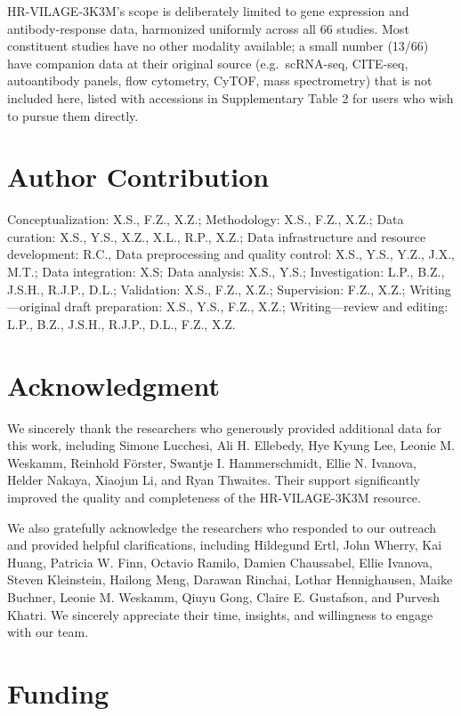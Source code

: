 \documentclass[
  12pt]{article}
\begin{document}
\noindent HR-VILAGE-3K3M's scope is deliberately limited to gene expression and antibody-response data, harmonized uniformly across all 66 studies. Most constituent studies have no other modality available; a small number (13/66) have companion data at their original source (e.g.\ scRNA-seq, CITE-seq, autoantibody panels, flow cytometry, CyTOF, mass spectrometry) that is not included here, listed with accessions in Supplementary Table 2 for users who wish to pursue them directly.

\section{Author Contribution}
Conceptualization: X.S., F.Z., X.Z.; Methodology: X.S., F.Z., X.Z.; Data curation: X.S., Y.S., X.Z., X.L., R.P., X.Z.; Data infrastructure and resource development: R.C., Data preprocessing and quality control: X.S., Y.S., Y.Z., J.X., M.T.; Data integration: X.S; Data analysis: X.S., Y.S.; Investigation: L.P., B.Z., J.S.H., R.J.P., D.L.; Validation: X.S., F.Z., X.Z.; Supervision: F.Z., X.Z.; Writing—original draft preparation: X.S., Y.S., F.Z., X.Z.; Writing—review and editing:  L.P., B.Z., J.S.H., R.J.P., D.L., F.Z., X.Z.

\section{Acknowledgment}

We sincerely thank the researchers who generously provided additional data for this work, including Simone Lucchesi, Ali H. Ellebedy, Hye Kyung Lee, Leonie M. Weskamm, Reinhold Förster, Swantje I. Hammerschmidt, Ellie N. Ivanova, Helder Nakaya, Xiaojun Li, and Ryan Thwaites. Their support significantly improved the quality and completeness of the HR-VILAGE-3K3M resource.

We also gratefully acknowledge the researchers who responded to our outreach and provided helpful clarifications, including Hildegund Ertl, John Wherry, Kai Huang, Patricia W. Finn, Octavio Ramilo, Damien Chaussabel, Ellie Ivanova, Steven Kleinstein, Hailong Meng, Darawan Rinchai, Lothar Hennighausen, Maike Buchner, Leonie M. Weskamm, Qiuyu Gong, Claire E. Gustafson, and Purvesh Khatri. We sincerely appreciate their time, insights, and willingness to engage with our team.

\section{Funding}
\end{document}
